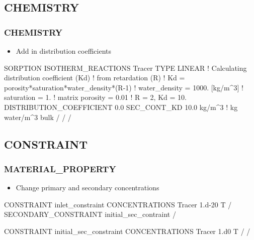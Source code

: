 \documentclass{beamer}
\newcommand\bluecomment[1]{{{\color{blue} #1}}}
\newcommand\magentacomment[1]{{{\color{magenta} #1}}}
\begin{document}
\subsection{CHEMISTRY}

\begin{frame}[fragile]\frametitle{CHEMISTRY}

\begin{itemize}
\item Add in distribution coefficients
\end{itemize}

\begin{semiverbatim}
SORPTION
  ISOTHERM_REACTIONS
    Tracer
      TYPE LINEAR   
      \bluecomment{! Calculating distribution coefficient (Kd)
      ! from retardation (R)
      !   Kd = porosity*saturation*water_density*(R-1)
      !   water_density = 1000. [kg/m^3]
      !   saturation = 1. 
      !   matrix porosity = 0.01 
      ! R = 2, Kd = 10.}
      DISTRIBUTION_COEFFICIENT 0.0 
      SEC_CONT_KD 10.0 kg/m^3   \bluecomment{! kg water/m^3 bulk}
    /
  /
/
\end{semiverbatim}

\end{frame}

\subsection{CONSTRAINT}

\begin{frame}[fragile]\frametitle{MATERIAL\_PROPERTY}

\begin{itemize}
\item Change primary and secondary concentrations
\end{itemize}

\begin{semiverbatim}
CONSTRAINT inlet_constraint
  CONCENTRATIONS
    Tracer  \magentacomment{1.d-20}  T
  /
  \magentacomment{SECONDARY_CONSTRAINT initial_sec_contraint}
/

CONSTRAINT initial_sec_constraint
  CONCENTRATIONS
    Tracer  \magentacomment{1.d0}  T 
  /
/
  
\end{semiverbatim}

\end{frame}
\end{document}
